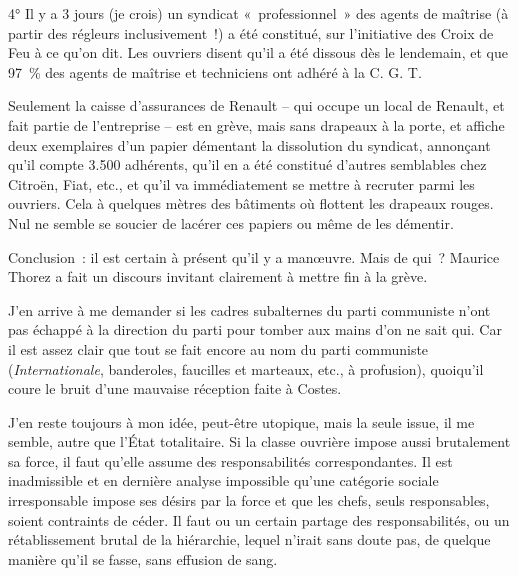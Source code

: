 \documentclass[french,twoside]{book} %
\begin{document}
4° Il y a 3 jours (je crois) un syndicat « professionnel » des agents de maîtrise (à partir des régleurs inclusivement !) a été constitué, sur l'initiative des Croix de Feu à ce qu'on dit. Les ouvriers disent qu'il a été dissous dès le lendemain, et que 97 \% des agents de maîtrise et techniciens ont adhéré à la C. G. T.\par
Seulement la caisse d'assurances de Renault – qui occupe un local de Renault, et fait partie de l'entreprise – est en grève, mais sans drapeaux à la porte, et affiche deux exemplaires d'un papier démentant la dissolution du syndicat, annonçant qu'il compte 3.500 adhérents, qu'il en a été constitué d'autres semblables chez Citroën, Fiat, etc., et qu'il va immédiatement se mettre à recruter parmi les ouvriers. Cela à quelques mètres des bâtiments où flottent les drapeaux rouges. Nul ne semble se soucier de lacérer ces papiers ou même de les démentir.\par
Conclusion : il est certain à présent qu'il y a manœuvre. Mais de qui ? Maurice Thorez a fait un discours invitant clairement à mettre fin à la grève.\par
J'en arrive à me demander si les cadres subalternes du parti communiste n'ont pas échappé à la direction du parti pour tomber aux mains d'on ne sait qui. Car il est assez clair que tout se fait encore au nom du parti communiste ({\itshape Internationale}, banderoles, faucilles et marteaux, etc., à profusion), quoiqu'il coure le bruit d'une mauvaise réception faite à Costes.\par
J'en reste toujours à mon idée, peut-être utopique, mais la seule issue, il me semble, autre que l'État totalitaire. Si la classe ouvrière impose aussi brutalement sa force, il faut qu'elle assume des responsabilités correspondantes. Il est inadmissible et en dernière analyse impossible qu'une catégorie sociale irresponsable impose ses désirs par la force et que les chefs, seuls responsables, soient contraints de céder. Il faut ou un certain partage des responsabilités, ou un rétablissement brutal de la hiérarchie, lequel n'irait sans doute pas, de quelque manière qu'il se fasse, sans effusion de sang.\par
\end{document}
